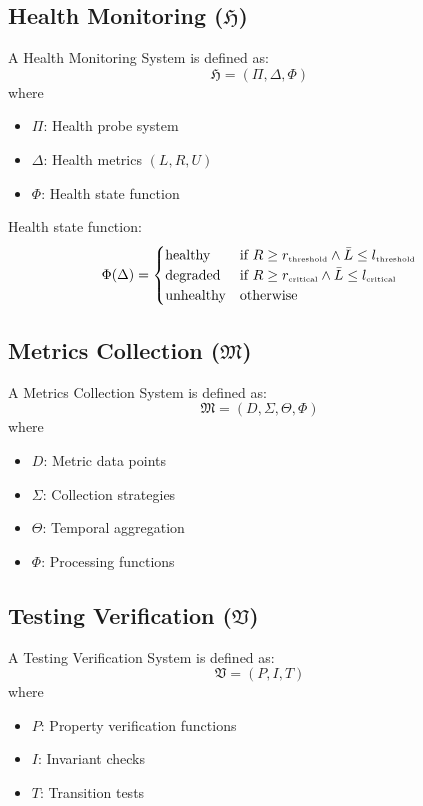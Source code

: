 \documentclass[10pt]{article}
\begin{document}
\subsection{Health Monitoring ($\mathfrak{H}$)}

A Health Monitoring System is defined as:
$$\mathfrak{H} = (\Pi, \Delta, \Phi)$$
where
\begin{itemize}[leftmargin=2em]
\item $\Pi$: Health probe system
\item $\Delta$: Health metrics $(L, R, U)$
\item $\Phi$: Health state function
\end{itemize}

Health state function:
$$
\Phi(\Delta) = \begin{cases}
\text{healthy} & \text{if } R \geq r_{\text{\tiny threshold}} \wedge \bar{L} \leq l_{\text{\tiny threshold}} \\
\text{degraded} & \text{if } R \geq r_{\text{\tiny critical}} \wedge \bar{L} \leq l_{\text{\tiny critical}} \\
\text{unhealthy} & \text{otherwise}
\end{cases}
$$

\subsection{Metrics Collection ($\mathfrak{M}$)}

A Metrics Collection System is defined as:
$$\mathfrak{M} = (D, \Sigma, \Theta, \Phi)$$
where
\begin{itemize}[leftmargin=2em]
\item $D$: Metric data points
\item $\Sigma$: Collection strategies
\item $\Theta$: Temporal aggregation
\item $\Phi$: Processing functions
\end{itemize}

\subsection{Testing Verification ($\mathfrak{V}$)}

A Testing Verification System is defined as:
$$\mathfrak{V} = (P, I, T)$$
where
\begin{itemize}[leftmargin=2em]
\item $P$: Property verification functions
\item $I$: Invariant checks
\item $T$: Transition tests
\end{itemize}
\end{document}
